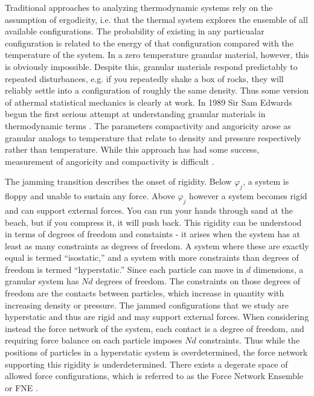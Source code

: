 Traditional approaches to analyzing thermodynamic systems rely on the assumption of ergodicity, i.e. that the thermal system explores the ensemble of all available configurations. The probability of existing in any particualar configuration is related to the energy of that configuration compared with the temperature of the system. In a zero temperature granular material, however, this is obviously impossible. Despite this, granular materials respond predictably to repeated disturbances, e.g. if you repeatedly shake a box of rocks, they will reliably settle into a configuration of roughly the same density. Thus some version of athermal statistical mechanics is clearly at work. In 1989 Sir Sam Edwards begun the first serious attempt at understanding granular materials in thermodynamic terms \cite{edwards_theory_1989}. The parameters compactivity and angoricity arose as granular analogs to temperature that relate to density and pressure respectively rather than temperature. While this approach has had some success, measurement of angoricity and compactivity is difficult  \cite{bi_statistical_2015}.

The jamming transition describes the onset of rigidity. Below $\varphi_j$, a system is floppy and unable to sustain any force. Above $\varphi_j$ however a system becomes rigid and can support external forces. You can run your hands through sand at the beach, but if you compress it, it will push back. This rigidity can be understood in terms of degrees of freedom and constaints - it arises when the system has at least as many constraints as degrees of freedom. A system where these are exactly equal is termed ``isostatic,'' and a system with more constraints than degrees of freedom is termed ``hyperstatic.'' Since each particle can move in $d$ dimensions, a granular system has $Nd$ degrees of freedom. The constraints on those degrees of freedom are the contacts between particles, which increase in quantity with increasing density or pressure. The jammed configurations that we study are hyperstatic and thus are rigid and may support external forces. When considering instead the force network of the system, each contact is a degree of freedom, and requiring force balance on each particle imposes $Nd$ constraints. Thus while the positions of particles in a hyperstatic system is overdetermined, the force network supporting this rigidity is underdetermined. There exists a degerate space of allowed force configurations, which is referred to as the Force Network Ensemble or FNE \cite{snoeijer_force_2004,tighe_force_2010}. 

